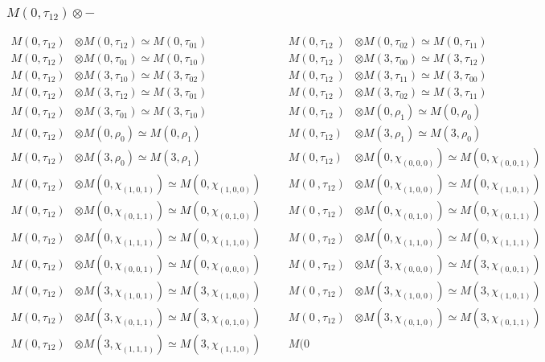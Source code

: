 \subsubsection{$M(0,\tau_{12})\otimes -$}
\begin{align*}
M(0,\tau_{12}) &\otimes M(0,\tau_{12}) \simeq M(0,\tau_{01}) &&& M(0,\tau_{12}\
) &\otimes M(0,\tau_{02}) \simeq M(0,\tau_{11})\\
M(0,\tau_{12}) &\otimes M(0,\tau_{01}) \simeq M(0,\tau_{10}) &&& M(0,\tau_{12}\
) &\otimes M(3,\tau_{00}) \simeq M(3,\tau_{12})\\
M(0,\tau_{12}) &\otimes M(3,\tau_{10}) \simeq M(3,\tau_{02}) &&& M(0,\tau_{12}\
) &\otimes M(3,\tau_{11}) \simeq M(3,\tau_{00})\\
M(0,\tau_{12}) &\otimes M(3,\tau_{12}) \simeq M(3,\tau_{01}) &&& M(0,\tau_{12}\
) &\otimes M(3,\tau_{02}) \simeq M(3,\tau_{11})\\
M(0,\tau_{12}) &\otimes M(3,\tau_{01}) \simeq M(3,\tau_{10}) &&& M(0,\tau_{12}\
) &\otimes M(0,\rho_{1}) \simeq M(0,\rho_{0})\\
M(0,\tau_{12}) &\otimes M(0,\rho_{0}) \simeq M(0,\rho_{1}) &&& M(0,\tau_{12}) \
&\otimes M(3,\rho_{1}) \simeq M(3,\rho_{0})\\
M(0,\tau_{12}) &\otimes M(3,\rho_{0}) \simeq M(3,\rho_{1}) &&& M(0,\tau_{12}) \
&\otimes M(0,\chi_{(0,0,0)}) \simeq M(0,\chi_{(0,0,1)})\\
M(0,\tau_{12}) &\otimes M(0,\chi_{(1,0,1)}) \simeq M(0,\chi_{(1,0,0)}) &&& M(0\
,\tau_{12}) &\otimes M(0,\chi_{(1,0,0)}) \simeq M(0,\chi_{(1,0,1)})\\
M(0,\tau_{12}) &\otimes M(0,\chi_{(0,1,1)}) \simeq M(0,\chi_{(0,1,0)}) &&& M(0\
,\tau_{12}) &\otimes M(0,\chi_{(0,1,0)}) \simeq M(0,\chi_{(0,1,1)})\\
M(0,\tau_{12}) &\otimes M(0,\chi_{(1,1,1)}) \simeq M(0,\chi_{(1,1,0)}) &&& M(0\
,\tau_{12}) &\otimes M(0,\chi_{(1,1,0)}) \simeq M(0,\chi_{(1,1,1)})\\
M(0,\tau_{12}) &\otimes M(0,\chi_{(0,0,1)}) \simeq M(0,\chi_{(0,0,0)}) &&& M(0\
,\tau_{12}) &\otimes M(3,\chi_{(0,0,0)}) \simeq M(3,\chi_{(0,0,1)})\\
M(0,\tau_{12}) &\otimes M(3,\chi_{(1,0,1)}) \simeq M(3,\chi_{(1,0,0)}) &&& M(0\
,\tau_{12}) &\otimes M(3,\chi_{(1,0,0)}) \simeq M(3,\chi_{(1,0,1)})\\
M(0,\tau_{12}) &\otimes M(3,\chi_{(0,1,1)}) \simeq M(3,\chi_{(0,1,0)}) &&& M(0\
,\tau_{12}) &\otimes M(3,\chi_{(0,1,0)}) \simeq M(3,\chi_{(0,1,1)})\\
M(0,\tau_{12}) &\otimes M(3,\chi_{(1,1,1)}) \simeq M(3,\chi_{(1,1,0)}) &&& M(0\

\end{align*}
